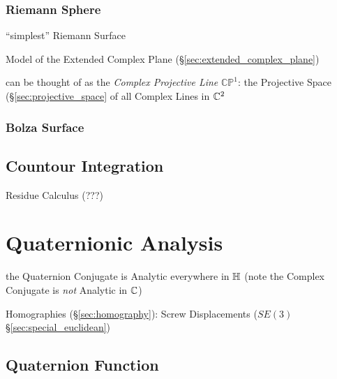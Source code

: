 \subsubsection{Riemann Sphere}\label{sec:riemann_sphere}

``simplest'' Riemann Surface

Model of the Extended Complex Plane
(\S\ref{sec:extended_complex_plane})

can be thought of as the \emph{Complex Projective Line}
$\mathbb{CP}^1$: the Projective Space (\S\ref{sec:projective_space} of
all Complex Lines in $\mathbb{C}^2$



\subsubsection{Bolza Surface}\label{sec:bolza_surface}



\subsection{Countour Integration}\label{sec:contour_integration}

Residue Calculus (???) %



\section{Quaternionic Analysis}\label{sec:quaternionic_analysis}

the Quaternion Conjugate is Analytic everywhere in $\mathbb{H}$
(note the Complex Conjugate is \emph{not} Analytic in $\mathbb{C}$)

Homographies (\S\ref{sec:homography}): Screw Displacements ($SE(3)$
\S\ref{sec:special_euclidean})



\subsection{Quaternion Function}\label{sec:quaternion_function}

